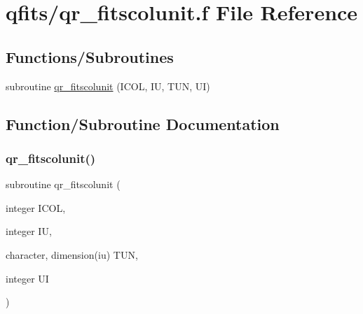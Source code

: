 \hypertarget{qr__fitscolunit_8f}{}\section{qfits/qr\+\_\+fitscolunit.f File Reference}
\label{qr__fitscolunit_8f}
\subsection*{Functions/\+Subroutines}
\begin{DoxyCompactItemize}
\item 
subroutine \hyperlink{qr__fitscolunit_8f_a13cd9a5c6c8bbcf473c27c4afa4db159}{qr\+\_\+fitscolunit} (I\+C\+OL, IU, T\+UN, UI)
\end{DoxyCompactItemize}


\subsection{Function/\+Subroutine Documentation}
\mbox{\label{qr__fitscolunit_8f_a13cd9a5c6c8bbcf473c27c4afa4db159}} 
\subsubsection{\texorpdfstring{qr\+\_\+fitscolunit()}{qr\_fitscolunit()}}
{\footnotesize\ttfamily subroutine qr\+\_\+fitscolunit (\begin{DoxyParamCaption}\item[{integer}]{I\+C\+OL,  }\item[{integer}]{IU,  }\item[{character, dimension(iu)}]{T\+UN,  }\item[{integer}]{UI }\end{DoxyParamCaption})}

